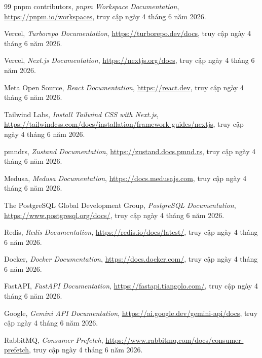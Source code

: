 \begin{thebibliography}{99}
pnpm contributors,
\textit{pnpm Workspace Documentation},
\url{https://pnpm.io/workspaces},
truy cập ngày 4 tháng 6 năm 2026.

Vercel,
\textit{Turborepo Documentation},
\url{https://turborepo.dev/docs},
truy cập ngày 4 tháng 6 năm 2026.

Vercel,
\textit{Next.js Documentation},
\url{https://nextjs.org/docs},
truy cập ngày 4 tháng 6 năm 2026.

Meta Open Source,
\textit{React Documentation},
\url{https://react.dev},
truy cập ngày 4 tháng 6 năm 2026.

Tailwind Labs,
\textit{Install Tailwind CSS with Next.js},
\url{https://tailwindcss.com/docs/installation/framework-guides/nextjs},
truy cập ngày 4 tháng 6 năm 2026.

pmndrs,
\textit{Zustand Documentation},
\url{https://zustand.docs.pmnd.rs},
truy cập ngày 4 tháng 6 năm 2026.

Medusa,
\textit{Medusa Documentation},
\url{https://docs.medusajs.com},
truy cập ngày 4 tháng 6 năm 2026.

The PostgreSQL Global Development Group,
\textit{PostgreSQL Documentation},
\url{https://www.postgresql.org/docs/},
truy cập ngày 4 tháng 6 năm 2026.

Redis,
\textit{Redis Documentation},
\url{https://redis.io/docs/latest/},
truy cập ngày 4 tháng 6 năm 2026.

Docker,
\textit{Docker Documentation},
\url{https://docs.docker.com/},
truy cập ngày 4 tháng 6 năm 2026.

FastAPI,
\textit{FastAPI Documentation},
\url{https://fastapi.tiangolo.com/},
truy cập ngày 4 tháng 6 năm 2026.

Google,
\textit{Gemini API Documentation},
\url{https://ai.google.dev/gemini-api/docs},
truy cập ngày 4 tháng 6 năm 2026.

RabbitMQ,
\textit{Consumer Prefetch},
\url{https://www.rabbitmq.com/docs/consumer-prefetch},
truy cập ngày 4 tháng 6 năm 2026.

\end{thebibliography}

\clearpage
